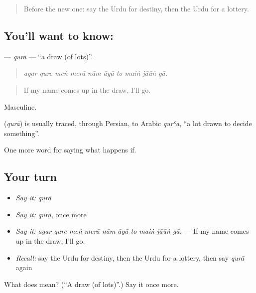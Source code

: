 \begin{quote}
Before the new one: say the Urdu for destiny, then the Urdu for a lottery.
\end{quote}

\subsection*{You'll want to know: }
\textbf{} — \emph{qurā} — \textquotedblleft{}a draw (of lots)\textquotedblright{}.

\begin{quote}
         
\end{quote}

\begin{quote}
\emph{agar qure meṅ merā nām āyā to maiṅ jāūṅ gā.}
\end{quote}

\begin{quote}
If my name comes up in the draw, I'll go.
\end{quote}

Masculine.

\begin{cousinweb}
\textbf{} (\emph{qurā}) is usually traced, through Persian, to Arabic \emph{qurʿa}, \textquotedblleft{}a lot drawn to decide something\textquotedblright{}.
\end{cousinweb}

\begin{grammarlens}[title={What you've built}]
One more word for saying what happens if.
\end{grammarlens}

\subsection*{Your turn}
\begin{itemize}
\raggedright
  \item \emph{Say it:} \emph{qurā}
  \item \emph{Say it:} \emph{qurā}, once more
  \item \emph{Say it:} \emph{agar qure meṅ merā nām āyā to maiṅ jāūṅ gā.} — If my name comes up in the draw, I'll go.
  \item \emph{Recall:} say the Urdu for destiny, then the Urdu for a lottery, then say \emph{qurā} again
\end{itemize}

\begin{tcolorbox}[breakable,colback=teal!4,colframe=teal!35!black,title={Before you move on}]
What does  mean? (\textquotedblleft{}A draw (of lots)\textquotedblright{}.) Say it once more.
\end{tcolorbox}
